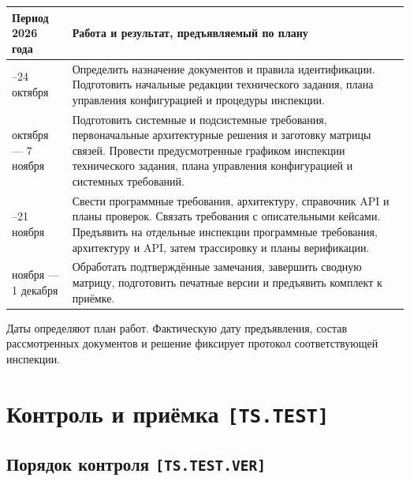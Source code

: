\documentclass[12pt,a4paper]{article}
\begin{document}
{\def\LTcaptype{none} %
\begin{longtable}[]{@{}
  >{\raggedright\arraybackslash}p{}
  >{\raggedright\arraybackslash}p{}@{}}
\toprule\noalign{}
\begin{minipage}[b]{\linewidth}\raggedright
Период 2026 года
\end{minipage} & \begin{minipage}[b]{\linewidth}\raggedright
Работа и результат, предъявляемый по плану
\end{minipage} \\
\midrule\noalign{}
\endhead
\bottomrule\noalign{}
\endlastfoot
20--24 октября & Определить назначение документов и правила идентификации. Подготовить начальные редакции технического задания, плана управления конфигурацией и процедуры инспекции. \\
25 октября --- 7 ноября & Подготовить системные и подсистемные требования, первоначальные архитектурные решения и заготовку матрицы связей. Провести предусмотренные графиком инспекции технического задания, плана управления конфигурацией и системных требований. \\
8--21 ноября & Свести программные требования, архитектуру, справочник API и планы проверок. Связать требования с описательными кейсами. Предъявить на отдельные инспекции программные требования, архитектуру и API, затем трассировку и планы верификации. \\
22 ноября --- 1 декабря & Обработать подтверждённые замечания, завершить сводную матрицу, подготовить печатные версии и предъявить комплект к приёмке. \\
\end{longtable}
}

Даты определяют план работ. Фактическую дату предъявления, состав рассмотренных документов и решение фиксирует протокол соответствующей инспекции.

\section{\texorpdfstring{Контроль и приёмка \texttt{{[}TS.TEST{]}}}{Контроль и приёмка {[}TS.TEST{]}}}\label{6-ux43aux43eux43dux442ux440ux43eux43bux44c-ux438-ux43fux440ux438ux451ux43cux43aux430-tstest}

\hypertarget{6-контроль-и-приёмка-tstest}{}

\hypertarget{ts-test}{}

\subsection{\texorpdfstring{Порядок контроля \texttt{[TS.\allowbreak{}TEST.\allowbreak{}VER]}}{Порядок контроля }}\label{61-ux43fux43eux440ux44fux434ux43eux43a-ux43aux43eux43dux442ux440ux43eux43bux44f-tstestver}
\end{document}
